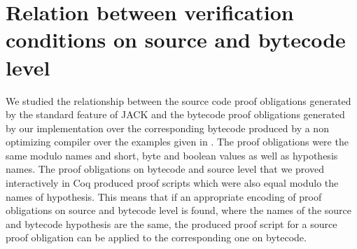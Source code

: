 
 \section{Relation between verification conditions on source and bytecode level }  \label{pogEquiv}

 We studied the relationship between the source code proof obligations generated 
 by the standard feature of JACK and the bytecode proof obligations generated by our implementation over the corresponding bytecode
 produced by a non optimizing compiler over the examples given in \cite{JPVC03JKM}. The proof obligations were the same modulo names and
short, byte and boolean values as well as hypothesis names. The proof obligations on bytecode and source level
that we proved interactively in Coq produced proof scripts which were also equal modulo the names of hypothesis. This means that if an
 appropriate encoding of proof obligations on source and bytecode level is found, where the names of the source and bytecode hypothesis are the same,
 the produced proof script for a source proof obligation can be applied to the corresponding one on bytecode. 



 


